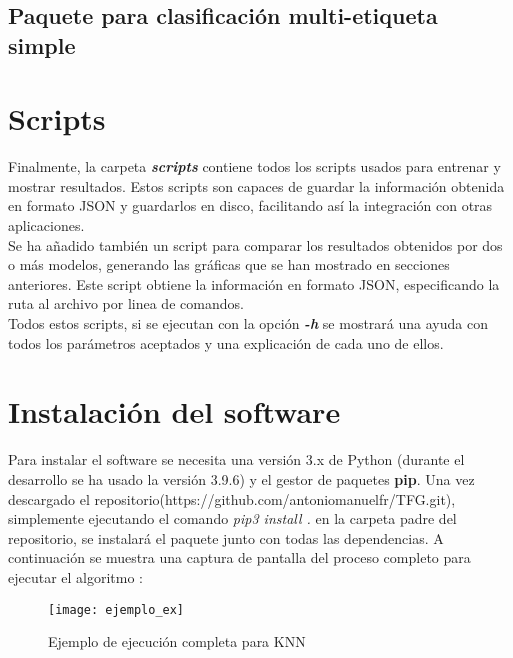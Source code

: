 \subsection{Paquete para clasificación multi-etiqueta simple}
\label{sec:sftw-mlc}
\section{Scripts}
Finalmente, la carpeta \textbf{\textit{scripts}} contiene todos los scripts usados para entrenar y mostrar resultados. Estos scripts son capaces de guardar la información obtenida en formato JSON y guardarlos en disco, facilitando así la integración con otras aplicaciones.\\
\linebreak
Se ha añadido también un script para comparar los resultados obtenidos por dos o más modelos, generando las gráficas que se han mostrado en secciones anteriores. Este script obtiene la información en formato JSON, especificando la ruta al archivo por linea de comandos. \\
\linebreak
Todos estos scripts, si se ejecutan con la opción \textbf{\textit{-h}} se mostrará una ayuda con todos los parámetros aceptados y una explicación de cada uno de ellos.
\section{Instalación del software}
Para instalar el software se necesita una versión 3.x de Python (durante el desarrollo se ha usado la versión 3.9.6) y el gestor de paquetes \textbf{pip}. Una vez descargado el repositorio(https://github.com/antoniomanuelfr/TFG.git), simplemente ejecutando el comando \textit{pip3 install .} en la carpeta padre del repositorio, se instalará el paquete junto con todas las dependencias.
A continuación se muestra una captura de pantalla del proceso completo para ejecutar el algoritmo :
\begin{figure}[H]
    \texttt{[image: ejemplo\_ex]}
    \caption{Ejemplo de ejecución completa para KNN}
    \label{cap:ex}
\end{figure}

